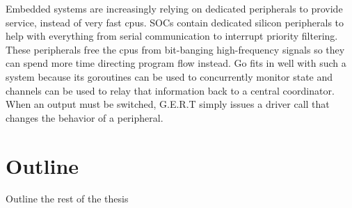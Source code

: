 Embedded systems are increasingly relying on dedicated peripherals to
provide service, instead of very fast cpus. SOCs contain dedicated
silicon peripherals to help with everything from serial communication to
interrupt priority filtering. These peripherals free the cpus from bit-banging
high-frequency signals so they can spend more time directing program
flow instead. Go fits in well with such a system because its goroutines can be
used to concurrently monitor state and channels can be used to relay that information
back to a central coordinator. When an output must be switched, G.E.R.T simply
issues a driver call that changes the behavior of a peripheral.

\section{Outline}
Outline the rest of the thesis

